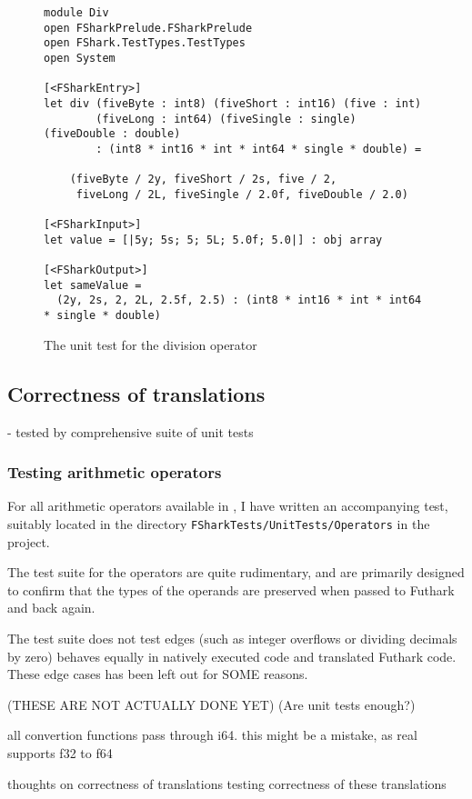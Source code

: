 \begin{figure}[h]
  \centering
\begin{verbatim}
module Div
open FSharkPrelude.FSharkPrelude
open FShark.TestTypes.TestTypes
open System

[<FSharkEntry>]
let div (fiveByte : int8) (fiveShort : int16) (five : int) 
        (fiveLong : int64) (fiveSingle : single) (fiveDouble : double) 
        : (int8 * int16 * int * int64 * single * double) =

    (fiveByte / 2y, fiveShort / 2s, five / 2, 
     fiveLong / 2L, fiveSingle / 2.0f, fiveDouble / 2.0)

[<FSharkInput>]
let value = [|5y; 5s; 5; 5L; 5.0f; 5.0|] : obj array

[<FSharkOutput>]
let sameValue = 
  (2y, 2s, 2, 2L, 2.5f, 2.5) : (int8 * int16 * int * int64 * single * double)
\end{verbatim}
  \caption{The unit test for the \fshark{} division operator}
  \label{fig:fsharkdivtest}
\end{figure}
\subsection{Correctness of \fshark{} translations }
- tested by comprehensive suite of unit tests
\subsubsection{Testing arithmetic operators}
For all arithmetic operators available in \fshark{}, I have written an
accompanying test, suitably located in the directory
\texttt{FSharkTests/UnitTests/Operators} in the \fshark{} project.

The test suite for the operators are quite rudimentary, and are primarily
designed to confirm that the types of the operands are preserved when passed to
Futhark \csharp{} and back again.

The test suite does not test edges (such as integer overflows or dividing
decimals by zero) behaves equally in natively executed \fshark{} code and
translated Futhark \csharp{} code.
These edge cases has been left out for SOME reasons.

(THESE ARE NOT ACTUALLY DONE YET)
(Are unit tests enough?)

all convertion functions pass through i64. this might be a mistake, as real
supports f32 to f64

thoughts on correctness of translations
testing correctness of these translations

